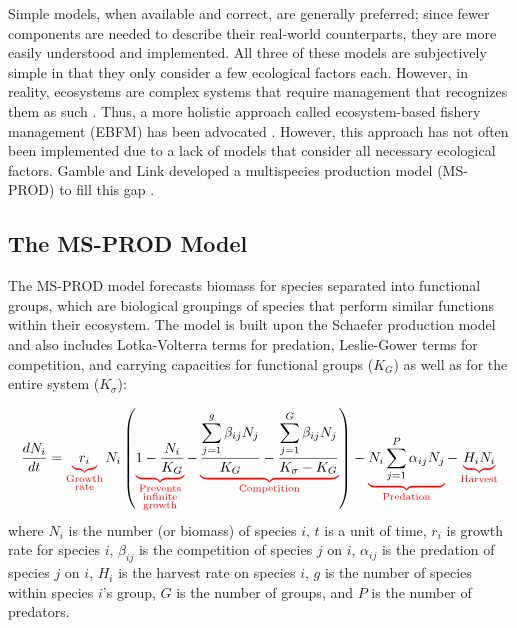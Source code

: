Simple models, when available and correct, are generally preferred; since fewer components are needed to describe their real-world counterparts, they are more easily understood and implemented.  All three of these models are subjectively simple in that they only consider a few ecological factors each. However, in reality, ecosystems are complex systems that require management that recognizes them as such \cite{christensen1996}.  Thus, a more holistic approach called ecosystem-based fishery management (EBFM) has been advocated \cite{united1999}.  However, this approach has not often been implemented due to a lack of models that consider all necessary ecological factors.  Gamble and Link developed a multispecies production model (MS-PROD) to fill this gap \citeyearpar{gamble2009}.

\subsection{The MS-PROD Model}

The MS-PROD model forecasts biomass for species separated into functional groups, which are biological groupings of species that perform similar functions within their ecosystem.  The model is built upon the Schaefer production model and also includes Lotka-Volterra terms for predation, Leslie-Gower terms for competition, and carrying capacities for functional groups ($K_G$) as well as for the entire system ($K_{\sigma}$):

\begin{equation}
\frac{d N_i}{dt} = \redub{r_i}_{\substack{\text{Growth}\\\text{rate}}} N_i \left(\redub{1 - \frac{N_i}{K_G}}_{\substack{\text{Prevents}\\\text{infinite}\\\text{growth}}} - \redub{\frac{\displaystyle\sum\limits_{j=1}^g \beta_{ij} N_j}{K_G} - \frac{\displaystyle\sum\limits_{j=1}^G \beta_{ij} N_j}{K_{\sigma} - K_G}}_{\substack{\text{Competition}}} \right) - \redub{N_i \displaystyle\sum\limits_{j=1}^P \alpha_{ij} N_j}_{\substack{\text{Predation}}} - \redub{H_i N_i}_{\substack{\text{Harvest}}}
\end{equation}
where $N_i$ is the number (or biomass) of species $i$, $t$ is a unit of time, $r_i$ is growth rate for species $i$, $\beta_{ij}$ is the competition of species $j$ on $i$, $\alpha_{ij}$ is the predation of species $j$ on $i$, $H_i$ is the harvest rate on species $i$, $g$ is the number of species within species $i$'s group, $G$ is the number of groups, and $P$ is the number of predators.

